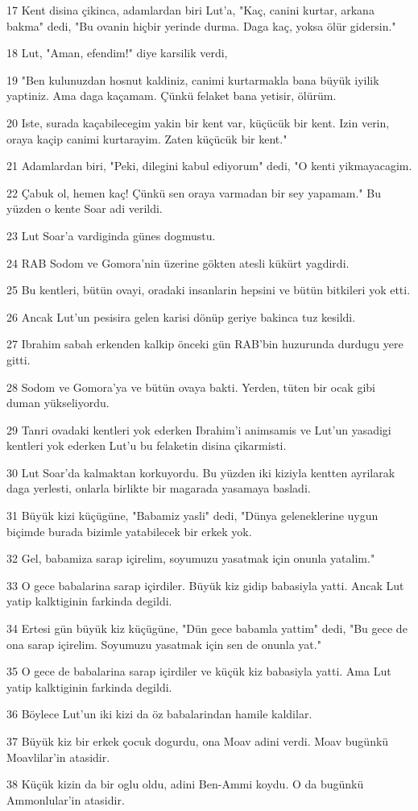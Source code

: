 \par 17 Kent disina çikinca, adamlardan biri Lut'a, "Kaç, canini kurtar, arkana bakma" dedi, "Bu ovanin hiçbir yerinde durma. Daga kaç, yoksa ölür gidersin."
\par 18 Lut, "Aman, efendim!" diye karsilik verdi,
\par 19 "Ben kulunuzdan hosnut kaldiniz, canimi kurtarmakla bana büyük iyilik yaptiniz. Ama daga kaçamam. Çünkü felaket bana yetisir, ölürüm.
\par 20 Iste, surada kaçabilecegim yakin bir kent var, küçücük bir kent. Izin verin, oraya kaçip canimi kurtarayim. Zaten küçücük bir kent."
\par 21 Adamlardan biri, "Peki, dilegini kabul ediyorum" dedi, "O kenti yikmayacagim.
\par 22 Çabuk ol, hemen kaç! Çünkü sen oraya varmadan bir sey yapamam." Bu yüzden o kente Soar adi verildi.
\par 23 Lut Soar'a vardiginda günes dogmustu.
\par 24 RAB Sodom ve Gomora'nin üzerine gökten atesli kükürt yagdirdi.
\par 25 Bu kentleri, bütün ovayi, oradaki insanlarin hepsini ve bütün bitkileri yok etti.
\par 26 Ancak Lut'un pesisira gelen karisi dönüp geriye bakinca tuz kesildi.
\par 27 Ibrahim sabah erkenden kalkip önceki gün RAB'bin huzurunda durdugu yere gitti.
\par 28 Sodom ve Gomora'ya ve bütün ovaya bakti. Yerden, tüten bir ocak gibi duman yükseliyordu.
\par 29 Tanri ovadaki kentleri yok ederken Ibrahim'i animsamis ve Lut'un yasadigi kentleri yok ederken Lut'u bu felaketin disina çikarmisti.
\par 30 Lut Soar'da kalmaktan korkuyordu. Bu yüzden iki kiziyla kentten ayrilarak daga yerlesti, onlarla birlikte bir magarada yasamaya basladi.
\par 31 Büyük kizi küçügüne, "Babamiz yasli" dedi, "Dünya geleneklerine uygun biçimde burada bizimle yatabilecek bir erkek yok.
\par 32 Gel, babamiza sarap içirelim, soyumuzu yasatmak için onunla yatalim."
\par 33 O gece babalarina sarap içirdiler. Büyük kiz gidip babasiyla yatti. Ancak Lut yatip kalktiginin farkinda degildi.
\par 34 Ertesi gün büyük kiz küçügüne, "Dün gece babamla yattim" dedi, "Bu gece de ona sarap içirelim. Soyumuzu yasatmak için sen de onunla yat."
\par 35 O gece de babalarina sarap içirdiler ve küçük kiz babasiyla yatti. Ama Lut yatip kalktiginin farkinda degildi.
\par 36 Böylece Lut'un iki kizi da öz babalarindan hamile kaldilar.
\par 37 Büyük kiz bir erkek çocuk dogurdu, ona Moav adini verdi. Moav bugünkü Moavlilar'in atasidir.
\par 38 Küçük kizin da bir oglu oldu, adini Ben-Ammi koydu. O da bugünkü Ammonlular'in atasidir.

